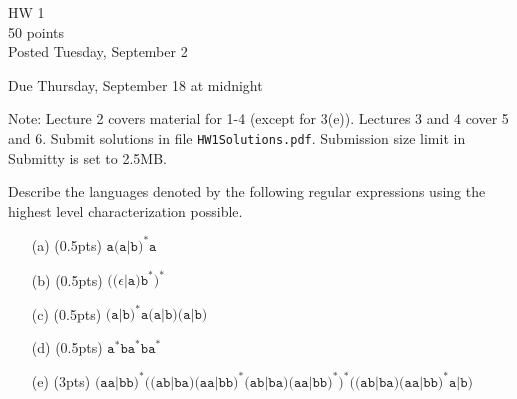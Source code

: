 \documentclass[11pt]{amsart}
\begin{document}
\begin{center}
\huge HW 1 \\
50 points \\

\Large Posted Tuesday, September 2

\Large Due Thursday, September 18 at midnight

\normalsize
\end{center}


Note: Lecture 2 covers material for 1-4 (except for 3(e)). Lectures 3 and 4 cover 5 and 6. Submit solutions in file \texttt{HW1Solutions.pdf}. Submission size limit in Submitty is set to 2.5MB.

\vspace{0.15in}

 Describe the languages denoted by the following regular expressions using the highest level characterization possible.


\begin{enumerate}

\item[(a)] (0.5pts) $\texttt{a(a|b)}^*\texttt{a}$

\item[(b)] (0.5pts) $\texttt{((}\epsilon \texttt{|a)b}^\texttt{*}\texttt{)}^\texttt{*}$

\item[(c)] (0.5pts) $\texttt{(a|b)}^*\texttt{a(a|b)(a|b)}$

\item[(d)] (0.5pts) $\texttt{a}^\texttt{*}\texttt{ba}^\texttt{*}\texttt{ba}^\texttt{*}$

\item[(e)] (3pts) $\texttt{(aa|bb)}^\texttt{*}\texttt{((ab|ba)(aa|bb)}^\texttt{*}\texttt{(ab|ba)(aa|bb)}^\texttt{*}\texttt{)}^\texttt{*}  \texttt{((ab|ba)(aa|bb)}^\texttt{*}\texttt{a|b)} $

\end{enumerate}

\vspace{0.5cm}
\end{document}
